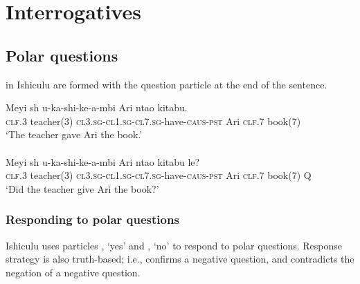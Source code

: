 \chapter{Interrogatives}

\section{Polar questions}

 in Ishiculu are formed with the question particle \textit{} at the end of the sentence.

\begin{exe}
\ex
\begin{xlist}
\ex
\gll Meyi {sh\textramshorns} u-ka-shi-ke-\textbeltl a-mbi Ari nta\textbeltl o kitabu. \\
\textsc{clf.3} teacher(3) \textsc{cl3.sg}-\textsc{cl1.sg}-\textsc{cl7.sg}-have-\textsc{caus}-\textsc{pst} Ari \textsc{clf.7} book(7) \\
\trans `The teacher gave Ari the book.' \\

\ 
\\

\ex
\gll Meyi {sh\textramshorns} u-ka-shi-ke-\textbeltl a-mbi Ari nta\textbeltl o kitabu le? \\
\textsc{clf.3} teacher(3) \textsc{cl3.sg}-\textsc{cl1.sg}-\textsc{cl7.sg}-have-\textsc{caus}-\textsc{pst} Ari \textsc{clf.7} book(7) Q \\
\trans `Did the teacher give Ari the book?'
\end{xlist}
\end{exe}

\subsection{Responding to polar questions}

Ishiculu uses particles \textit{}, `yes' and \textit{}, `no' to respond to polar questions. Response strategy is also truth-based; i.e., \textit{} confirms a negative question, and \textit{} contradicts the negation of a negative question.

